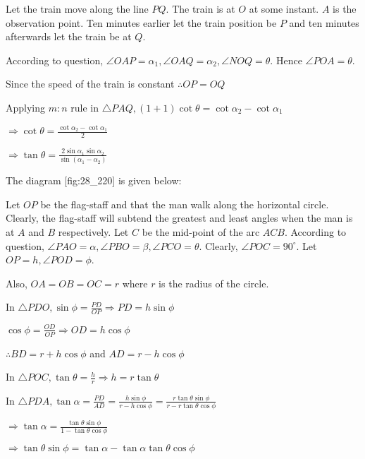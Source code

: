  \startplacefigure[reference=fig:28_219]
    \externalfigure[28_219.pdf]
  \stopplacefigure

  Let the train move along the line $PQ$. The train is at $O$ at some instant. $A$ is
  the observation point. Ten minutes earlier let the train position be $P$ and ten minutes
  afterwards let the train be at $Q$.

  According to question, $\angle OAP = \alpha_1, \angle OAQ = \alpha_2, \angle NOQ = \theta$. Hence
  $\angle POA = \theta$.

  Since the speed of the train is constant $\therefore OP = OQ$

  Applying $m:n$ rule in $\triangle PAQ, (1 + 1)\cot\theta = \cot\alpha_2 - \cot\alpha_1$

  $\Rightarrow \cot\theta = \frac{\cot\alpha_2 - \cot\alpha_1}{2}$

  $\Rightarrow \tan\theta = \frac{2\sin\alpha_1\sin\alpha_2}{\sin(\alpha_1 - \alpha_2)}$

\item The diagram [fig:28_220] is given below:

  \startplacefigure[reference=fig:28_220]
    \externalfigure[28_220.pdf]
  \stopplacefigure

  Let $OP$ be the flag-staff and that the man walk along the horizontal circle. Clearly, the
  flag-staff will subtend the greatest and least angles when the man is at $A$ and $B$
  respectively. Let $C$ be the mid-point of the arc $ACB$. According to question,
  $\angle PAO = \alpha, \angle PBO = \beta, \angle PCO = \theta$. Clearly, $\angle POC =
  90^\circ$. Let $OP = h, \angle POD = \phi$.

  Also, $OA = OB = OC = r$ where $r$ is the radius of the circle.

  In $\triangle PDO, \sin\phi = \frac{PD}{OP} \Rightarrow PD = h\sin\phi$

  $\cos\phi = \frac{OD}{OP} \Rightarrow OD = h\cos\phi$

  $\therefore BD = r + h\cos\phi$ and $AD = r - h\cos\phi$

  In $\triangle POC, \tan\theta = \frac{h}{r} \Rightarrow h = r\tan\theta$

  In $\triangle PDA, \tan\alpha = \frac{PD}{AD} = \frac{h\sin\phi}{r - h\cos\phi} =
  \frac{r\tan\theta\sin\phi}{r - r\tan\theta\cos\phi}$

  $\Rightarrow \tan\alpha = \frac{\tan\theta\sin\phi}{1 - \tan\theta\cos\phi}$

  $\Rightarrow \tan\theta\sin\phi = \tan\alpha - \tan\alpha\tan\theta\cos\phi$

